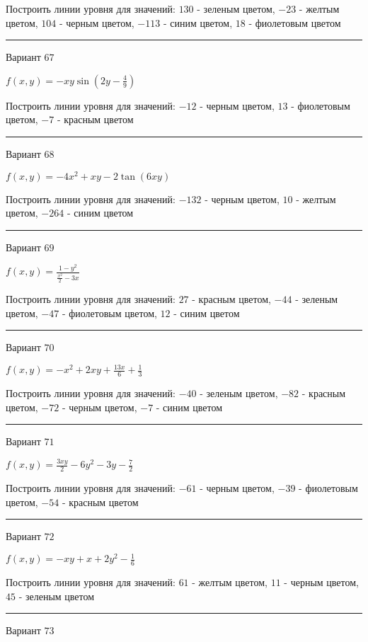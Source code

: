 \documentclass[11pt]{report}
\begin{document}
Построить линии уровня для значений: $130$ - зеленым цветом, $-23$ - желтым цветом, $104$ - черным цветом, $-113$ - синим цветом, $18$ - фиолетовым цветом
\begin{center}
\noindent\rule{8cm}{0.4pt}
\end{center}
Вариант $67$


$f(x, y) = - x y \sin{\left(2 y - \frac{4}{9} \right)}$

Построить линии уровня для значений: $-12$ - черным цветом, $13$ - фиолетовым цветом, $-7$ - красным цветом
\begin{center}
\noindent\rule{8cm}{0.4pt}
\end{center}
Вариант $68$


$f(x, y) = - 4 x^{2} + x y - 2 \tan{\left(6 x y \right)}$

Построить линии уровня для значений: $-132$ - черным цветом, $10$ - желтым цветом, $-264$ - синим цветом
\begin{center}
\noindent\rule{8cm}{0.4pt}
\end{center}
Вариант $69$


$f(x, y) = \frac{1 - y^{2}}{\frac{x^{2}}{2} - 3 x}$

Построить линии уровня для значений: $27$ - красным цветом, $-44$ - зеленым цветом, $-47$ - фиолетовым цветом, $12$ - синим цветом
\begin{center}
\noindent\rule{8cm}{0.4pt}
\end{center}
Вариант $70$


$f(x, y) = - x^{2} + 2 x y + \frac{13 x}{6} + \frac{1}{3}$

Построить линии уровня для значений: $-40$ - зеленым цветом, $-82$ - красным цветом, $-72$ - черным цветом, $-7$ - синим цветом
\begin{center}
\noindent\rule{8cm}{0.4pt}
\end{center}
Вариант $71$


$f(x, y) = \frac{3 x y}{2} - 6 y^{2} - 3 y - \frac{7}{2}$

Построить линии уровня для значений: $-61$ - черным цветом, $-39$ - фиолетовым цветом, $-54$ - красным цветом
\begin{center}
\noindent\rule{8cm}{0.4pt}
\end{center}
Вариант $72$


$f(x, y) = - x y + x + 2 y^{2} - \frac{1}{6}$

Построить линии уровня для значений: $61$ - желтым цветом, $11$ - черным цветом, $45$ - зеленым цветом
\begin{center}
\noindent\rule{8cm}{0.4pt}
\end{center}
Вариант $73$
\end{document}
